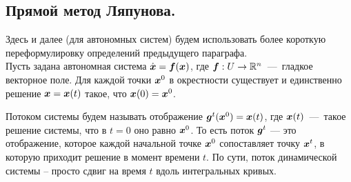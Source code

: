 \subsection{Прямой метод Ляпунова.}
Здесь и далее (для автономных систем) будем использовать более короткую переформулировку определений предыдущего параграфа. \\
Пусть задана автономная система $\dot{\boldsymbol{x}} = \boldsymbol{f}(\boldsymbol{x})$, где $\boldsymbol{f}: U \to \mathbb{R}^n$~---~гладкое векторное поле.
Для каждой точки $\boldsymbol{x}^0$ в окрестности существует и единственно решение $\boldsymbol{x} = \boldsymbol{x}(t)$ такое, что $\boldsymbol{x}(0) = \boldsymbol{x}^0$. \\
\begin{definition}
    Потоком системы будем называть отображение $\boldsymbol{g}^t(\boldsymbol{x}^0) = \boldsymbol{x}(t)$, где $\boldsymbol{x}(t)$~---~такое решение системы, что в $t = 0$ оно равно $\boldsymbol{x}^0$.
    То есть поток $\boldsymbol{g}^t$ — это отображение, которое каждой начальной точке $\boldsymbol{x}^0$ сопоставляет точку $\boldsymbol{x}^t$, в которую приходит решение в момент времени $t$. По сути, поток динамической системы -- просто сдвиг на время $t$ вдоль интегральных кривых.
\end{definition}

